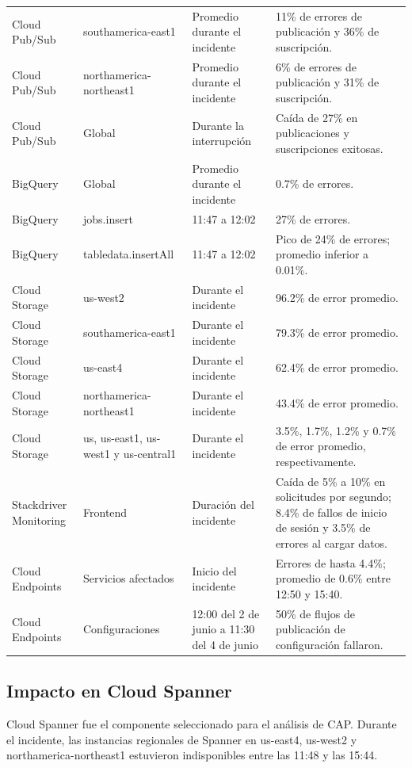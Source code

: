 \documentclass[11pt]{article}
\begin{document}
\begin{table}[htbp]
\begin{tabularx}{\textwidth}{p{3.2cm}p{3.4cm}p{3.2cm}X}
Cloud Pub/Sub & southamerica-east1 & Promedio durante el incidente & 11\% de errores de publicación y 36\% de suscripción. \\
Cloud Pub/Sub & northamerica-northeast1 & Promedio durante el incidente & 6\% de errores de publicación y 31\% de suscripción. \\
Cloud Pub/Sub & Global & Durante la interrupción & Caída de 27\% en publicaciones y suscripciones exitosas. \\
BigQuery & Global & Promedio durante el incidente & 0.7\% de errores. \\
BigQuery & jobs.insert & 11:47 a 12:02 & 27\% de errores. \\
BigQuery & tabledata.insertAll & 11:47 a 12:02 & Pico de 24\% de errores; promedio inferior a 0.01\%. \\
Cloud Storage & us-west2 & Durante el incidente & 96.2\% de error promedio. \\
Cloud Storage & southamerica-east1 & Durante el incidente & 79.3\% de error promedio. \\
Cloud Storage & us-east4 & Durante el incidente & 62.4\% de error promedio. \\
Cloud Storage & northamerica-northeast1 & Durante el incidente & 43.4\% de error promedio. \\
Cloud Storage & us, us-east1, us-west1 y us-central1 & Durante el incidente & 3.5\%, 1.7\%, 1.2\% y 0.7\% de error promedio, respectivamente. \\
Stackdriver Monitoring & Frontend & Duración del incidente & Caída de 5\% a 10\% en solicitudes por segundo; 8.4\% de fallos de inicio de sesión y 3.5\% de errores al cargar datos. \\
Cloud Endpoints & Servicios afectados & Inicio del incidente & Errores de hasta 4.4\%; promedio de 0.6\% entre 12:50 y 15:40. \\
Cloud Endpoints & Configuraciones & 12:00 del 2 de junio a 11:30 del 4 de junio & 50\% de flujos de publicación de configuración fallaron. \\
\hline
\end{tabularx}
\end{table}

\subsection{Impacto en Cloud Spanner}

Cloud Spanner fue el componente seleccionado para el análisis de CAP. Durante el incidente,
las instancias regionales de Spanner en us-east4, us-west2 y northamerica-northeast1
estuvieron indisponibles entre las 11:48 y las 15:44. \cite{googlecloud19009}
\end{document}
